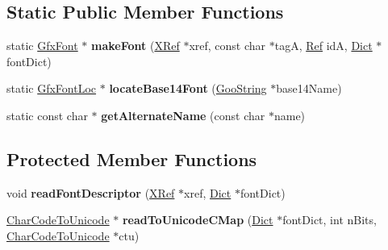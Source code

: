 \subsection*{Static Public Member Functions}
\begin{DoxyCompactItemize}
\item 
\mbox{\label{class_gfx_font_ac7c3ae289ab6551fab22f30a6312f394}} 
static \hyperlink{class_gfx_font}{Gfx\+Font} $\ast$ {\bfseries make\+Font} (\hyperlink{class_x_ref}{X\+Ref} $\ast$xref, const char $\ast$tagA, \hyperlink{struct_ref}{Ref} idA, \hyperlink{class_dict}{Dict} $\ast$font\+Dict)
\item 
\mbox{\label{class_gfx_font_a6dc2b12cd045727b56a17c4f23d77d4a}} 
static \hyperlink{class_gfx_font_loc}{Gfx\+Font\+Loc} $\ast$ {\bfseries locate\+Base14\+Font} (\hyperlink{class_goo_string}{Goo\+String} $\ast$base14\+Name)
\item 
\mbox{\label{class_gfx_font_a345ae9546aaafedc2712cc2b29cc85dd}} 
static const char $\ast$ {\bfseries get\+Alternate\+Name} (const char $\ast$name)
\end{DoxyCompactItemize}
\subsection*{Protected Member Functions}
\begin{DoxyCompactItemize}
\item 
\mbox{\label{class_gfx_font_a84b60eb7d29b33b80be0be6338a567f8}} 
void {\bfseries read\+Font\+Descriptor} (\hyperlink{class_x_ref}{X\+Ref} $\ast$xref, \hyperlink{class_dict}{Dict} $\ast$font\+Dict)
\item 
\mbox{\label{class_gfx_font_a18a9d9c499eb405ef0c0ef4b216831d3}} 
\hyperlink{class_char_code_to_unicode}{Char\+Code\+To\+Unicode} $\ast$ {\bfseries read\+To\+Unicode\+C\+Map} (\hyperlink{class_dict}{Dict} $\ast$font\+Dict, int n\+Bits, \hyperlink{class_char_code_to_unicode}{Char\+Code\+To\+Unicode} $\ast$ctu)
\end{DoxyCompactItemize}
